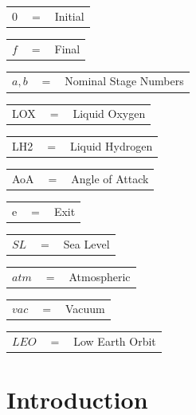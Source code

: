\documentclass[journal]{new-aiaa}
\begin{document}
				\begin{tabular}{p{1.2cm}p{1cm}p{5cm}}
					$0$ & $=$ & Initial\\
				\end{tabular} 
		\begin{tabular}{p{1.2cm}p{1cm}p{5cm}}
	$f$ & $=$ & Final\\
\end{tabular} 
\begin{tabular}{p{1.2cm}p{1cm}p{5cm}}
	$a,b$ & $=$ & Nominal Stage Numbers\\
\end{tabular} 
\begin{tabular}{p{1.2cm}p{1cm}p{5cm}}
	LOX & $=$ & Liquid Oxygen\\
\end{tabular} 
\begin{tabular}{p{1.2cm}p{1cm}p{5cm}}
	LH2 & $=$ & Liquid Hydrogen\\
	
\end{tabular} 
\begin{tabular}{p{1.2cm}p{1cm}p{5cm}}
	AoA & $=$ & Angle of Attack\\
	
\end{tabular} 
\begin{tabular}{p{1.2cm}p{1cm}p{5cm}}
	e & $=$ & Exit\\
\end{tabular} 
\begin{tabular}{p{1.2cm}p{1cm}p{5cm}}
	$SL$ & $=$ & Sea Level\\
\end{tabular} 
\begin{tabular}{p{1.2cm}p{1cm}p{5cm}}
	$atm$ & $=$ & Atmospheric\\
	
\end{tabular} 
\begin{tabular}{p{1.2cm}p{1cm}p{5cm}}
	$vac$ & $=$ & Vacuum\\
	
\end{tabular} 
\begin{tabular}{p{1.2cm}p{1cm}p{5cm}}
	$LEO$ & $=$ & Low Earth Orbit\\
	
\end{tabular} 
\newpage
\section{Introduction}
\end{document}
